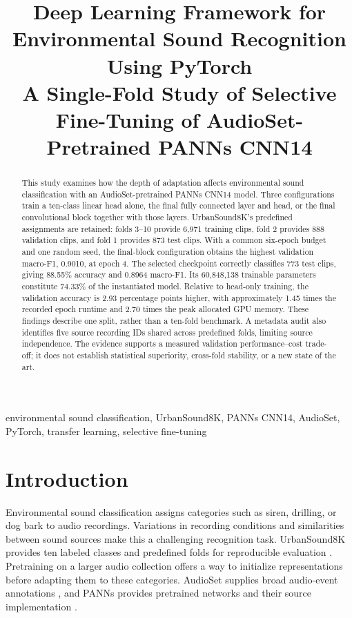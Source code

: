 \documentclass[conference]{IEEEtran}
\title{Deep Learning Framework for Environmental Sound Recognition Using PyTorch\\
\large A Single-Fold Study of Selective Fine-Tuning of AudioSet-Pretrained PANNs CNN14}
\author{\IEEEauthorblockN{Ayush Ranjan and Sandeep Gupta}
\IEEEauthorblockA{Department of Data Science and Engineering\\
Manipal University of Jaipur\\Jaipur, India\\
ayushranjan.works@gmail.com}}
\begin{document}
\maketitle

\begin{abstract}
This study examines how the depth of adaptation affects environmental sound classification with an AudioSet-pretrained PANNs CNN14 model. Three configurations train a ten-class linear head alone, the final fully connected layer and head, or the final convolutional block together with those layers. UrbanSound8K's predefined assignments are retained: folds 3--10 provide 6,971 training clips, fold 2 provides 888 validation clips, and fold 1 provides 873 test clips. With a common six-epoch budget and one random seed, the final-block configuration obtains the highest validation macro-F1, 0.9010, at epoch 4. The selected checkpoint correctly classifies 773 test clips, giving 88.55\% accuracy and 0.8964 macro-F1. Its 60,848,138 trainable parameters constitute 74.33\% of the instantiated model. Relative to head-only training, the validation accuracy is 2.93 percentage points higher, with approximately 1.45 times the recorded epoch runtime and 2.70 times the peak allocated GPU memory. These findings describe one split, rather than a ten-fold benchmark. A metadata audit also identifies five source recording IDs shared across predefined folds, limiting source independence. The evidence supports a measured validation performance--cost trade-off; it does not establish statistical superiority, cross-fold stability, or a new state of the art.
\end{abstract}
\begin{IEEEkeywords}
environmental sound classification, UrbanSound8K, PANNs CNN14, AudioSet, PyTorch, transfer learning, selective fine-tuning
\end{IEEEkeywords}

\section{Introduction}\label{sec:intro}
Environmental sound classification assigns categories such as siren, drilling, or dog bark to audio recordings. Variations in recording conditions and similarities between sound sources make this a challenging recognition task. UrbanSound8K provides ten labeled classes and predefined folds for reproducible evaluation \cite{salamon2014urbansound,urbansoundwebsite}. Pretraining on a larger audio collection offers a way to initialize representations before adapting them to these categories. AudioSet supplies broad audio-event annotations \cite{gemmeke2017audioset}, and PANNs provides pretrained networks and their source implementation \cite{kong2020panns,pannsrepo}.
\end{document}
